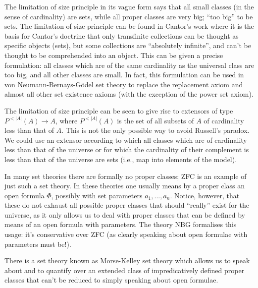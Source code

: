 \documentclass[12pt]{article}
\begin{document}
The limitation of size principle in its vague form says that all small classes (in the sense of cardinality) are sets, while all proper classes are very big; ``too big'' to be sets. The limitation of size principle can be found in Cantor's work where it is the basis for Cantor's doctrine that only transfinite collections can be thought as specific objects (sets), but some collections are ``absolutely infinite'', and can't be thought to be comprehended into an object. This can be given a precise formulation: all classes which are of the same cardinality as the universal class are too big, and all other classes are small. In fact, this formulation can be used in von Neumann-Bernays-G\"odel set theory to replace the replacement axiom and almost all other set existence axioms (with the exception of the power set axiom).

The limitation of size principle can be seen to give rise to extensors of type $P^{<|A|}(A) \rightarrow A$, where $P^{<|A|}(A)$ is the set of all subsets of $A$ of cardinality less than that of $A$. This is not the only possible way to avoid Russell's paradox. We could use an extensor according to which all classes which are of cardinality less than that of the universe or for which the cardinality of their complement is less than that of the universe are sets (i.e., map into elements of the model). 

In many set theories there are formally no proper classes; ZFC is an example of just such a set theory. In these theories one usually means by a proper class an open formula $\Phi$, possibly with set parameters $a_1,...,a_n$. Notice, however, that these do not exhaust all possible proper classes that should ``really'' exist for the universe, as it only allows us to deal with proper classes that can be defined by means of an open formula with parameters. The theory NBG formalises this usage: it's conservative over ZFC (as clearly speaking about open formulae with parameters must be!). 

There is a set theory known as Morse-Kelley set theory which allows us to speak about and to quantify over an extended class of impredicatively defined proper classes that can't be reduced to simply speaking about open formulae.
\end{document}
